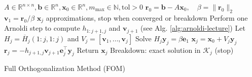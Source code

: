 \begin{algorithm}[H]
    \begin{algorithmic}[0]
        \Require
        \State $A \in \mathbb{R}^{n \times n}, \mathbf{b} \in \mathbb{R}^n, \mathbf{x}_0 \in \mathbb{R}^n, m_{\max} \in \mathbb{N}, \text{tol} > 0$
        \State $\mathbf{r}_0 = \mathbf{b} - A\mathbf{x}_0, \quad \beta = \|\mathbf{r}_0\|_2$
        \State $\mathbf{v}_1 = \mathbf{r}_0 / \beta$
        \Ensure
        \State $\mathbf{x}_j$ approximations, stop when converged or breakdown
        \State Perform one Arnoldi step to compute $h_{1:j+1,j}$ and $\mathbf{v}_{j+1}$ (see Alg. \ref{alg:arnoldi-lecture})
        \State Let $H_j = \overline{H}_j(1:j,1:j)$ and $V_j = [\mathbf{v}_1,\ldots,\mathbf{v}_j]$
        \State Solve $H_j \mathbf{y}_j = \beta \mathbf{e}_1$
        \State $\mathbf{x}_j = \mathbf{x}_0 + V_j \mathbf{y}_j$
        \State $\mathbf{r}_j = -h_{j+1,j} \mathbf{v}_{j+1} \mathbf{e}_j^\top \mathbf{y}_j$
        \State Return $\mathbf{x}_j$
        \EndIf
        \State Breakdown: exact solution in $\mathcal{K}_j$ (stop)
        \EndIf
        \EndFor
    \end{algorithmic}
    \caption{Full Orthogonalization Method (FOM)}
    \label{alg:fom}
\end{algorithm}